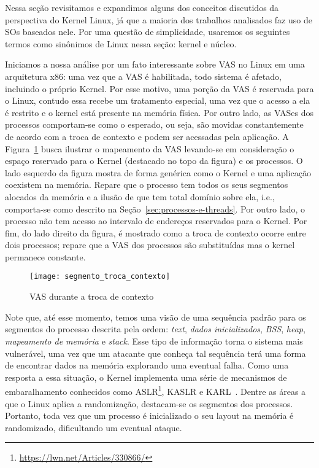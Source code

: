Nessa seção revisitamos e expandimos alguns dos conceitos discutidos da
perspectiva do Kernel Linux, já que
a maioria dos trabalhos analisados faz uso de SOs baseados nele.
Por uma questão de simplicidade, usaremos os seguintes termos
como sinônimos de Linux nessa seção: kernel e núcleo.

Iniciamos a nossa análise por um fato interessante sobre VAS no Linux em uma
arquitetura x86: uma vez que a VAS é habilitada, todo sistema é afetado,
incluindo o próprio Kernel. Por esse motivo, uma porção da VAS é reservada para
o Linux, contudo essa recebe um tratamento especial, uma vez que o acesso a ela é
restrito e o kernel está presente na memória física. Por outro lado, as VASes dos
processos comportam-se como o esperado, ou seja, são movidas constantemente de
acordo com a troca de contexto e podem ser acessadas pela aplicação. A
Figura~\ref{fig:vas_contexto} busca ilustrar o mapeamento da VAS levando-se em
consideração o espaço reservado para o Kernel (destacado no topo da figura) e os
processos. O lado esquerdo da figura mostra de forma genérica como o Kernel e
uma aplicação coexistem na memória. Repare que o processo tem todos os seus
segmentos alocados da memória e a ilusão de que tem total domínio sobre ela,
i.e., comporta-se como descrito na Seção~\ref{sec:processos-e-threads}. Por
outro lado, o processo não tem acesso ao intervalo de endereços reservados
para o Kernel. Por fim, do lado direito da figura, é mostrado como a troca de
contexto ocorre entre dois processos; repare que a VAS dos processos são
substituídas mas o kernel permanece constante.

\begin{figure}[!h]
  \centering
  \texttt{[image: segmento\_troca\_contexto]}
	\caption[VAS durante a troca de contexto]{VAS durante a troca de contexto~\citep{kernel_manage_mem}}
  \label{fig:vas_contexto}
\end{figure}

Note que, até esse momento, temos uma visão de uma sequência padrão para os
segmentos do processo descrita pela ordem: \emph{text}, \emph{dados
inicializados}, \emph{BSS}, \emph{heap}, \emph{mapeamento de memória} e
\emph{stack}. Esse tipo de informação torna o sistema mais vulnerável, uma vez
que um atacante que conheça tal sequência terá uma forma de encontrar dados na
memória explorando uma eventual falha. Como uma resposta a essa situação,
o Kernel implementa uma série de mecanismos de embaralhamento
conhecidos como ASLR\footnote{\url{https://lwn.net/Articles/330866/}}, KASLR e
KARL~\citep{kaslr}. Dentre as áreas a que o Linux aplica a randomização,
destacam-se os segmentos dos processos. Portanto, toda vez que um processo é
inicializado o seu layout na memória é randomizado, dificultando um eventual
ataque.


